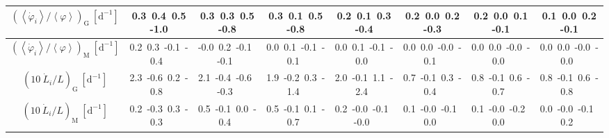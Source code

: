 \begin{table}[H]
{\begin{centering}
\begin{tabular}{|c|c|c|c|c|c|c|c|}
\hline
$\left(\left\langle \dot{\varphi}_{i}\right\rangle /\left\langle \varphi\right\rangle\right) _{\mathrm{G}}\ \left[\mathrm{d^{-1}}\right]$ & \textcolor{C1}{0.3}\ \textcolor{C2}{0.4}\ \textcolor{C3}{0.5}\ \textcolor{C4}{-1.0}\  & \textcolor{C1}{0.3}\ \textcolor{C2}{0.3}\ \textcolor{C3}{0.5}\ \textcolor{C4}{-0.8}\  & \textcolor{C1}{0.3}\ \textcolor{C2}{0.1}\ \textcolor{C3}{0.5}\ \textcolor{C4}{-0.8}\  & \textcolor{C1}{0.2}\ \textcolor{C2}{0.1}\ \textcolor{C3}{0.3}\ \textcolor{C4}{-0.4}\  & \textcolor{C1}{0.2}\ \textcolor{C2}{0.0}\ \textcolor{C3}{0.2}\ \textcolor{C4}{-0.3}\  & \textcolor{C1}{0.2}\ \textcolor{C2}{0.0}\ \textcolor{C3}{0.1}\ \textcolor{C4}{-0.1}\  & \textcolor{C1}{0.1}\ \textcolor{C2}{0.0}\ \textcolor{C3}{0.2}\ \textcolor{C4}{-0.1}\  \tabularnewline
\hline
$\left(\left\langle \dot{\varphi}_{i}\right\rangle /\left\langle \varphi\right\rangle\right) _{\mathrm{M}}\ \left[\mathrm{d^{-1}}\right]$ & \textcolor{C1}{0.2}\ \textcolor{C2}{0.3}\ \textcolor{C3}{-0.1}\ \textcolor{C4}{-0.4}\  & \textcolor{C1}{-0.0}\ \textcolor{C2}{0.2}\ \textcolor{C3}{-0.1}\ \textcolor{C4}{-0.1}\  & \textcolor{C1}{0.0}\ \textcolor{C2}{0.1}\ \textcolor{C3}{-0.1}\ \textcolor{C4}{-0.1}\  & \textcolor{C1}{0.0}\ \textcolor{C2}{0.1}\ \textcolor{C3}{-0.1}\ \textcolor{C4}{-0.0}\  & \textcolor{C1}{0.0}\ \textcolor{C2}{0.0}\ \textcolor{C3}{-0.0}\ \textcolor{C4}{-0.1}\  & \textcolor{C1}{0.0}\ \textcolor{C2}{0.0}\ \textcolor{C3}{-0.0}\ \textcolor{C4}{-0.0}\  & \textcolor{C1}{0.0}\ \textcolor{C2}{0.0}\ \textcolor{C3}{-0.0}\ \textcolor{C4}{-0.0}\  \tabularnewline
\hline
$\left(10\ \dot{L}_{i}/L\right)_{\mathrm{G}}\ \left[\mathrm{d^{-1}}\right]$ & \textcolor{C1}{2.3}\ \textcolor{C2}{-0.6}\ \textcolor{C3}{0.2}\ \textcolor{C4}{-0.8}\  & \textcolor{C1}{2.1}\ \textcolor{C2}{-0.4}\ \textcolor{C3}{-0.6}\ \textcolor{C4}{-0.3}\  & \textcolor{C1}{1.9}\ \textcolor{C2}{-0.2}\ \textcolor{C3}{0.3}\ \textcolor{C4}{-1.4}\  & \textcolor{C1}{2.0}\ \textcolor{C2}{-0.1}\ \textcolor{C3}{1.1}\ \textcolor{C4}{-2.4}\  & \textcolor{C1}{0.7}\ \textcolor{C2}{-0.1}\ \textcolor{C3}{0.3}\ \textcolor{C4}{-0.4}\  & \textcolor{C1}{0.8}\ \textcolor{C2}{-0.1}\ \textcolor{C3}{0.6}\ \textcolor{C4}{-0.7}\  & \textcolor{C1}{0.8}\ \textcolor{C2}{-0.1}\ \textcolor{C3}{0.6}\ \textcolor{C4}{-0.8}\  \tabularnewline
\hline
$\left(10\ \dot{L}_{i}/L\right)_{\mathrm{M}}\ \left[\mathrm{d^{-1}}\right]$ & \textcolor{C1}{0.2}\ \textcolor{C2}{-0.3}\ \textcolor{C3}{0.3}\ \textcolor{C4}{-0.3}\  & \textcolor{C1}{0.5}\ \textcolor{C2}{-0.1}\ \textcolor{C3}{0.0}\ \textcolor{C4}{-0.4}\  & \textcolor{C1}{0.5}\ \textcolor{C2}{-0.1}\ \textcolor{C3}{0.1}\ \textcolor{C4}{-0.7}\  & \textcolor{C1}{0.2}\ \textcolor{C2}{-0.0}\ \textcolor{C3}{-0.1}\ \textcolor{C4}{-0.0}\  & \textcolor{C1}{0.1}\ \textcolor{C2}{-0.0}\ \textcolor{C3}{-0.1}\ \textcolor{C4}{0.0}\  & \textcolor{C1}{0.1}\ \textcolor{C2}{-0.0}\ \textcolor{C3}{-0.2}\ \textcolor{C4}{0.0}\  & \textcolor{C1}{0.0}\ \textcolor{C2}{-0.0}\ \textcolor{C3}{-0.1}\ \textcolor{C4}{0.2}\  \tabularnewline

\end{tabular}
\end{centering}}
\end{table}
